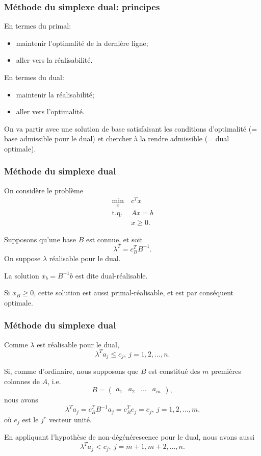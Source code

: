 \documentclass[usepdftitle=false]{beamer}
\begin{document}
\begin{frame}
	\frametitle{Méthode du simplexe dual: principes}
	
	En termes du primal:
	\begin{itemize}
		\item
		maintenir l'optimalité de la dernière ligne;
		\item
		aller vers la réalisabilité.
	\end{itemize}
	
	\mbox{}
	
	En termes du dual:
	\begin{itemize}
		\item
		maintenir la réalisabilité;
		\item
		aller vers l'optimalité.
	\end{itemize}
	
	\mbox{}
	
	On va partir avec une solution de base satisfaisant les conditions d’optimalité (= base admissible pour le dual) et chercher à la rendre admissible (= dual optimale).
	
\end{frame}

\begin{frame}
	\frametitle{Méthode du simplexe dual}
	
	On considère le problème
	\begin{align*}
		\min_x \ & c^Tx \\
		\mbox{t.q. } & Ax = b\\
		& x \geq 0.
	\end{align*}
	
	Supposons qu'une base $B$ est connue, et soit
	\[
	\lambda^T = c_B^T B^{-1}.
	\]
	On suppose $\lambda$ réalisable pour le dual.
	
	\mbox{}
	
	La solution $x_b = B^{-1}b$ est dite \mbox{dual-réalisable}.
	
	\mbox{}
	
	Si $x_B \geq 0$, cette solution est aussi primal-réalisable, et est par conséquent optimale.
	
\end{frame}

\begin{frame}
	\frametitle{Méthode du simplexe dual}
	
	Comme $\lambda$ est réalisable pour le dual,
	\[
	\lambda^T a_j \leq c_j,\ j = 1, 2, \ldots, n.
	\]
	
	\mbox{}
	
	Si, comme d'ordinaire, nous supposons que $B$ est constitué des $m$ premières colonnes de $A$, i.e.
	\[
	B = \begin{pmatrix}
		a_1 & a_2 & \ldots & a_m
	\end{pmatrix},
	\]
	nous avons
	\[
	\lambda^T a_j = c_B^T B^{-1} a_j = c_B^T e_j = c_j,\ j = 1, 2, \ldots, m.
	\]
	où $e_j$ est le $j^e$ vecteur unité.
	
	\mbox{}
	
	En appliquant l'hypothèse de non-dégénérescence pour le dual, nous avons aussi
	\[
	\lambda^T a_j < c_j,\ j = m+1, m+2, \ldots, n.
	\]
	
\end{frame}
\end{document}
